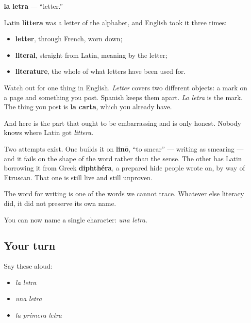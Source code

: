 \begin{cousinweb}
\textbf{la letra} — \textquotedblleft{}letter.\textquotedblright{}

Latin \textbf{littera} was a letter of the alphabet, and English took it three times:

\begin{itemize}
\raggedright
  \item \textbf{letter}, through French, worn down;
  \item \textbf{literal}, straight from Latin, meaning by the letter;
  \item \textbf{literature}, the whole of what letters have been used for.
\end{itemize}

Watch out for one thing in English. \emph{Letter} covers two different objects: a mark on a page and something you post. Spanish keeps them apart. \emph{La letra} is the mark. The thing you post is \textbf{la carta}, which you already have.

And here is the part that ought to be embarrassing and is only honest. Nobody knows where Latin got \emph{littera}.

Two attempts exist. One builds it on \textbf{linō}, \textquotedblleft{}to smear\textquotedblright{} — writing as smearing — and it fails on the shape of the word rather than the sense. The other has Latin borrowing it from Greek \textbf{diphthéra}, a prepared hide people wrote on, by way of Etruscan. That one is still live and still unproven.

The word for writing is one of the words we cannot trace. Whatever else literacy did, it did not preserve its own name.
\end{cousinweb}

\begin{grammarlens}[title={What you've built}]
You can now name a single character: \emph{una letra}.
\end{grammarlens}

\subsection*{Your turn}
Say these aloud:

\begin{itemize}
\raggedright
  \item \emph{la letra}
  \item \emph{una letra}
  \item \emph{la primera letra}
\end{itemize}

